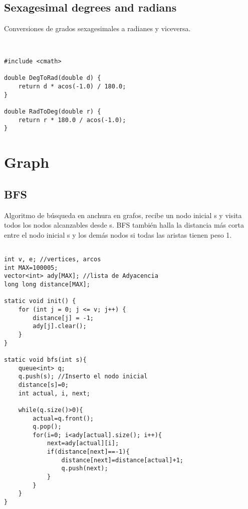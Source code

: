 \documentclass[11pt,letterpaper,twocolumn,twosided]{article}
\begin{document}
\subsection{Sexagesimal degrees and radians}
Conversiones de grados sexagesimales a radianes y viceversa.
\begin{lstlisting}


#include <cmath>

double DegToRad(double d) { 
	return d * acos(-1.0) / 180.0; 
}

double RadToDeg(double r) { 
	return r * 180.0 / acos(-1.0); 
}
\end{lstlisting}

\section{Graph}

\subsection{BFS}
Algoritmo de b\'usqueda en anchura en grafos, recibe un nodo inicial s y visita todos los nodos alcanzables desde s. BFS tambi\'en halla la distancia m\'as corta entre el nodo inicial s y los dem\'as nodos si todas las aristas tienen peso 1.

\begin{lstlisting}

int v, e; //vertices, arcos
int MAX=100005; 
vector<int> ady[MAX]; //lista de Adyacencia
long long distance[MAX];

static void init() {
    for (int j = 0; j <= v; j++) {
        distance[j] = -1;
        ady[j].clear();
    }
}

static void bfs(int s){
    queue<int> q;
    q.push(s); //Inserto el nodo inicial
    distance[s]=0;
    int actual, i, next;
        
    while(q.size()>0){
        actual=q.front();
        q.pop();
        for(i=0; i<ady[actual].size(); i++){
            next=ady[actual][i];
            if(distance[next]==-1){
                distance[next]=distance[actual]+1;
                q.push(next);
            }
        }
    }
}
\end{lstlisting}
\end{document}
